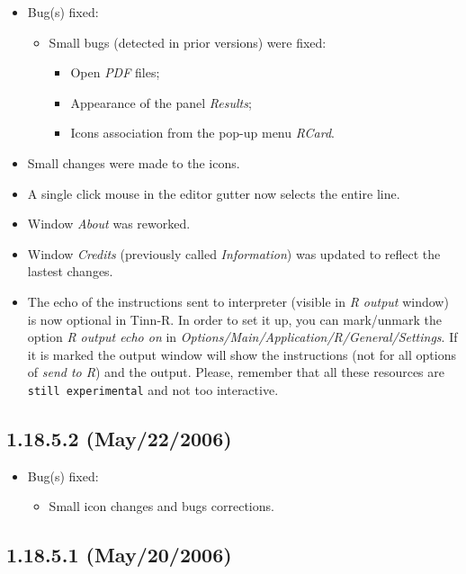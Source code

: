 \begin{itemize}
  \item Bug(s) fixed:
    \begin{itemize}
      \item Small bugs (detected in prior versions) were fixed:
        \begin{itemize}
          \item Open \textit{PDF} files;
          \item Appearance of the panel \textit{Results};
          \item Icons association from the pop-up menu \textit{RCard}.
        \end{itemize}
    \end{itemize}
  \item Small changes were made to the icons.
  \item A single click mouse in the editor gutter now selects the
    entire line.
  \item Window \textit{About} was reworked.
  \item Window \textit{Credits} (previously called \textit{Information})
    was updated to reflect the lastest changes.
  \item The echo of the instructions sent to \RR{} interpreter
    (visible in \textit{R output} window) is now optional in Tinn-R.
    In order to set it up, you can mark/unmark the option
    \textit{R output echo on} in \textit{Options/Main/Application/R/General/Settings}.
    If it is marked the \RR{} output window will show the instructions
    (not for all options of \textit{send to R}) and the \RR{} output.
    Please, remember that all these resources are \texttt{still experimental}
    and not too interactive.
\end{itemize}


\subsection{1.18.5.2 (May/22/2006)}

\begin{itemize}
  \item Bug(s) fixed:
    \begin{itemize}
      \item Small icon changes and bugs corrections.
    \end{itemize}
\end{itemize}


\subsection{1.18.5.1 (May/20/2006)}

